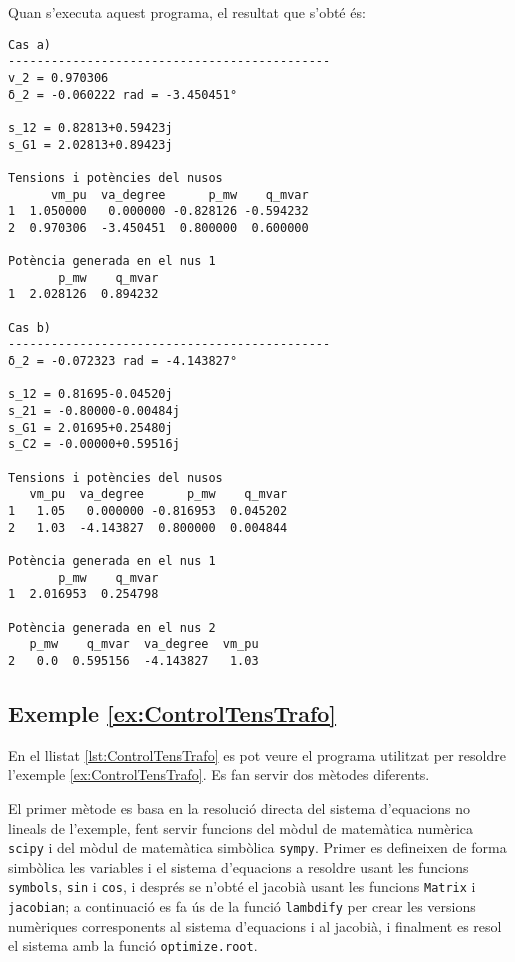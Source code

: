 Quan s'executa aquest programa, el resultat que s'obté és:
\lstset{
	language=,
	numbers=none,
	frame=none
}
\begin{lstlisting}
Cas a)
---------------------------------------------
v_2 = 0.970306
δ_2 = -0.060222 rad = -3.450451°

s_12 = 0.82813+0.59423j
s_G1 = 2.02813+0.89423j

Tensions i potències del nusos
      vm_pu  va_degree      p_mw    q_mvar
1  1.050000   0.000000 -0.828126 -0.594232
2  0.970306  -3.450451  0.800000  0.600000

Potència generada en el nus 1
       p_mw    q_mvar
1  2.028126  0.894232

Cas b)
---------------------------------------------
δ_2 = -0.072323 rad = -4.143827°

s_12 = 0.81695-0.04520j
s_21 = -0.80000-0.00484j
s_G1 = 2.01695+0.25480j
s_C2 = -0.00000+0.59516j

Tensions i potències del nusos
   vm_pu  va_degree      p_mw    q_mvar
1   1.05   0.000000 -0.816953  0.045202
2   1.03  -4.143827  0.800000  0.004844

Potència generada en el nus 1
       p_mw    q_mvar
1  2.016953  0.254798

Potència generada en el nus 2
   p_mw    q_mvar  va_degree  vm_pu
2   0.0  0.595156  -4.143827   1.03
\end{lstlisting} 


\hypertarget{exemple:ControlTensTrafo}{\subsection{Exemple \ref*{ex:ControlTensTrafo} \ControlTensTrafo}}
En el llistat \vref{lst:ControlTensTrafo} es pot veure el programa utilitzat per resoldre l'exemple \vref{ex:ControlTensTrafo}. Es fan servir dos mètodes diferents.

El primer mètode es basa en la resolució directa del sistema d'equacions no lineals de l'exemple, fent servir funcions  del mòdul de matemàtica numèrica \texttt{scipy} i del mòdul de matemàtica simbòlica \texttt{sympy}. Primer es defineixen de forma simbòlica les variables i el sistema d'equacions a resoldre usant les funcions \texttt{symbols}, \texttt{sin} i \texttt{cos}, i després se n'obté el jacobià usant les funcions \texttt{Matrix} i \texttt{jacobian}; a continuació es fa ús de la funció  \texttt{lambdify} per crear les versions numèriques corresponents al sistema d'equacions i al jacobià, i finalment es resol el sistema amb la funció \texttt{optimize.root}.

